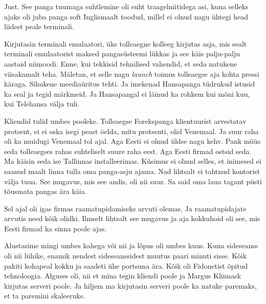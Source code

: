 
Just. See panga tuumaga suhtlemine oli suht traagelniitidega asi, kuna selleks 
ajaks oli juba panga soft  Inglismaalt toodud, millel ei olnud nagu ühtegi head 
liidest peale terminali.


Kirjutasin terminali emulaatori, üks tolleaegne kolleeg kirjutas asja, mis 
sealt terminali emulaatorist maksed pangasüsteemi lükkas ja see käis 
palju-palju aastaid niimoodi. Enne, kui  tekkisid tehnilised vahendid, et seda 
natukene viisakamalt teha. Mäletan, et  selle nagu \emph{launch} toimus 
tolleaegse  aja kohta pressi käraga. Sihukene meediaüritus tehti. Ja imekenad 
Hansapanga tüdrukud istusid ka seal ja tegid märkmeid. Ja 
Hansapangal ei läinud ka rohkem kui mõni kuu, kui 
Telehansa välja tuli.


Kliendid tulid umbes pooleks.  Tolleaegse Forekspanga klientuurist arvestatav 
protsent, ei ei oska isegi peast öelda, mitu protsenti, olid Venemaal. Ja suur 
raha oli ka muidugi Venemaal tol ajal. Aga Eesti ei olnud üldse nagu kehv. Pank 
müüs seda tolleaegses rahas suhteliselt suure raha eest. Aga Eesti firmad 
ostsid seda. Ma käisin seda ise Tallinnas installeerimas. Küsimus ei olnud 
selles, et inimesed ei saanud maalt linna tulla oma panga-asju ajama. Nad 
lihtsalt ei tahtnud kontorist välja tuua. See mugavus, mis see andis, oli nii 
suur. Sa said oma laua tagant püsti tõusmata pangas ära käia.


Sel ajal oli igas firmas raamatupidamiseks arvuti olemas. Ja raamatupidajate 
arvutis need kõik olidki. Ilmselt lihtsalt see mugavus ja aja kokkuhoid oli 
see, mis  Eesti firmad ka sinna poole ajas.


Alustasime  mingi umbes kahega või nii ja  lõpus oli  umbes kuus. Kuna 
sideseanss oli nii lühike, enamik nendest sideseanssidest muutus paari minuti 
sisse. Kõik pakiti kohapeal  kokku ja saadeti ühe portsuna ära. Kõik oli 
Fidonetist õpitud tehnoloogia. Alguses oli, nii et mina tegin kliendi poole ja 
Margus Kliimask kirjutas serveri poole. Ja hiljem 
ma kirjutasin serveri poole ka natuke paremaks, et ta paremini skaleeruks. 

